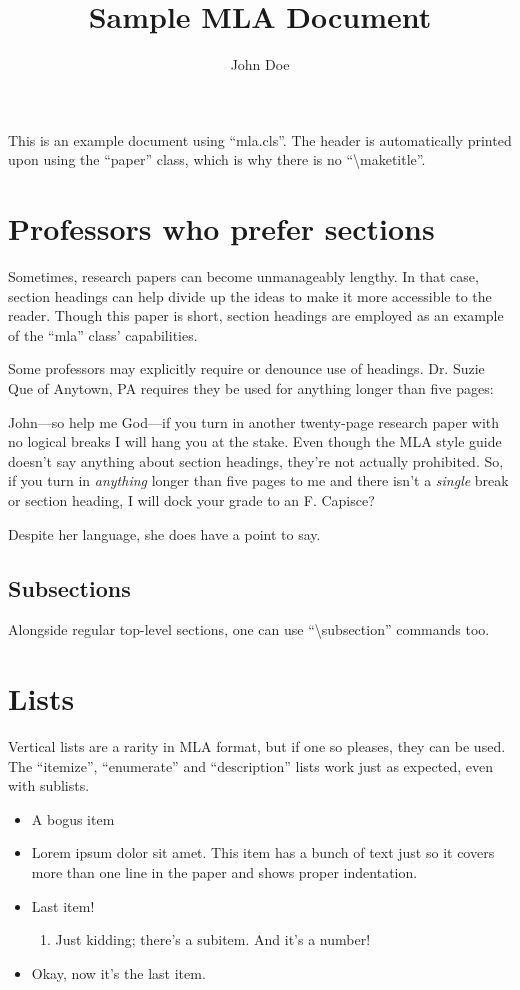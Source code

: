 \documentclass[mla7,microtype]{mla}
\title{Sample MLA Document}
\author{John Doe}
\date{\mladate} %
\begin{document}
\begin{paper}

This is an example document using ``mla.cls''.
The header is automatically printed upon using the ``paper'' class,
which is why there is no ``\textbackslash{}maketitle''.

\section{Professors who prefer sections}

Sometimes, research papers can become unmanageably lengthy.
In that case, section headings can help divide up the ideas
to make it more accessible to the reader.
Though this paper is short, section headings are employed
as an example of the ``mla'' class' capabilities.

Some professors may explicitly require or denounce use of headings.
Dr. Suzie Que of Anytown, PA requires they be used for anything
longer than five pages:
\begin{blockquote}
John---so help me God---if you turn in another twenty-page research
paper with no logical breaks I will hang you at the stake.
Even though the MLA style guide doesn't say anything about
section headings, they're not actually prohibited.
So, if you turn in \emph{anything} longer than five pages to me
and there isn't a \emph{single} break or section heading,
I will dock your grade to an F.
Capisce? \cite{que2019}
\end{blockquote}
Despite her language, she does have a point to say.

\subsection{Subsections}

Alongside regular top-level sections, one can use
``\textbackslash{}subsection'' commands too.

\section{Lists}

Vertical lists are a rarity in MLA format, but if one so pleases,
they can be used.
The ``itemize'', ``enumerate'' and ``description'' lists
work just as expected, even with sublists.

\begin{itemize}
\item A bogus item
\item Lorem ipsum dolor sit amet.  This item has a bunch of text
	just so it covers more than one line in the paper and shows
	proper indentation.
\item Last item!
\begin{enumerate}
\item Just kidding; there's a subitem.  And it's a number!
\end{enumerate}
\item Okay, now it's the last item.
\end{itemize}


\end{paper}
\end{document}
